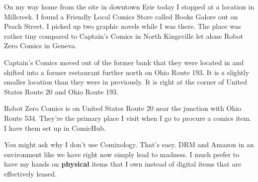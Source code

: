On my way home from the site in downtown Erie today I stopped at a
location in Millcreek. I found a Friendly Local Comics Store called
Books Galore out on Peach Street. I picked up two graphic novels while I
was there. The place was rather tiny compared to Captain's Comics in
North Kingsville let alone Robot Zero Comics in Geneva.

Captain's Comics moved out of the former bank that they were located in
and shifted into a former restaurant further north on Ohio Route 193. It
is a slightly smaller location than they were in previously. It is right
at the corner of United States Route 20 and Ohio Route 193.

Robot Zero Comics is on United States Route 20 near the junction with
Ohio Route 534. They're the primary place I visit when I go to procure a
comics item. I have them set up in ComicHub.

You might ask why I don't use Comixology. That's easy. DRM and Amazon in
an environment like we have right now simply lead to madness. I much
prefer to have my hands on \textbf{physical} items that I own instead of
digital items that are effectively leased.
